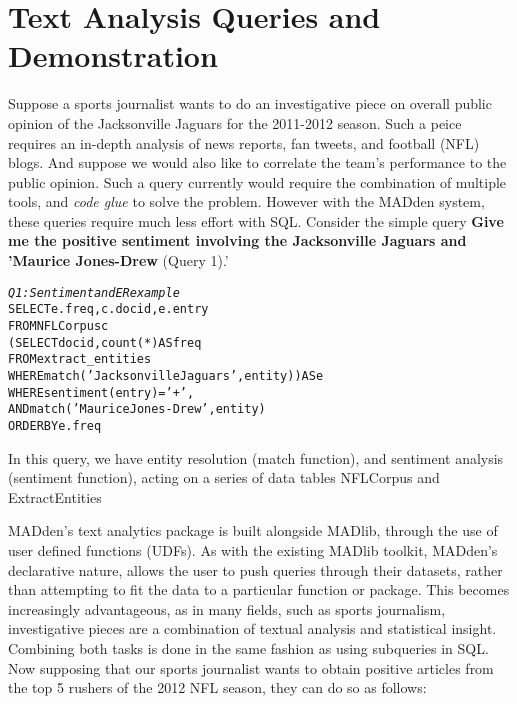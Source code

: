 \section{Text Analysis Queries and Demonstration}
Suppose a sports journalist wants to do an investigative
piece on overall public opinion of the Jacksonville Jaguars
for the 2011-2012 season. Such a peice requires an in-depth analysis of news
reports, fan tweets, and football (NFL) blogs. And suppose we would also like 
to correlate the team's performance to the public opinion. Such a query
currently would require the combination of multiple tools, and \textit{code glue}
to solve the problem. However with the MADden system, these queries require much
less effort with SQL. Consider the simple query \textbf{Give me the positive
sentiment involving the Jacksonville Jaguars and 'Maurice Jones-Drew} (Query 1).' 

\begin{small}
\begin{alltt}
\textit{Q1: Sentiment and ER example }
SELECT e.freq, c.docid,  e.entry
FROM NFLCorpus c
    (SELECT docid, count(*) AS freq
    FROM extract_entities
    WHERE match('Jacksonville Jaguars', entity)) AS e
WHERE sentiment(entry) = '+',
AND match('Maurice Jones-Drew', entity)
ORDER BY e.freq
\end{alltt}
\end{small}
\label{}

In this query, we have entity resolution (match function), and sentiment
analysis (sentiment function), acting on a series of data tables NFLCorpus and
ExtractEntities 

MADden's text analytics package is built alongside MADlib, through the use of
user defined functions (UDFs). As with the existing MADlib toolkit, MADden's 
declarative nature, allows the user to push queries through their datasets,
rather than attempting to fit the data to a particular function or package.
This becomes increasingly advantageous, as in many fields, such as sports
journalism, investigative pieces are a combination of textual analysis and
statistical insight. Combining both tasks is done in the same fashion as
using subqueries in SQL. Now supposing that our sports journalist wants
to obtain positive articles from the top 5 rushers of the 2012 NFL season,
they can do so as follows:

